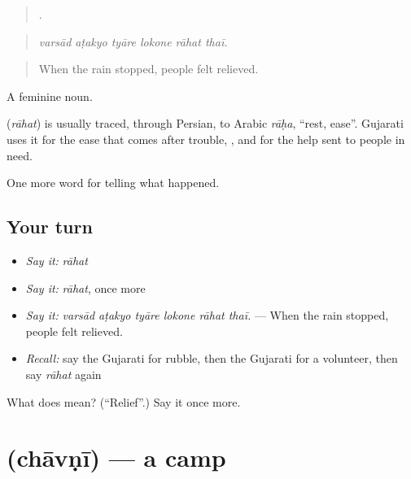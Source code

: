 \begin{quote}
     .
\end{quote}

\begin{quote}
\emph{varsād aṭakyo tyāre lokone rāhat thaī.}
\end{quote}

\begin{quote}
When the rain stopped, people felt relieved.
\end{quote}

A feminine noun.

\begin{cousinweb}
\textbf{} (\emph{rāhat}) is usually traced, through Persian, to Arabic \emph{rāḥa}, \textquotedblleft{}rest, ease\textquotedblright{}. Gujarati uses it for the ease that comes after trouble, \textbf{ }, and for the help sent to people in need.
\end{cousinweb}

\begin{grammarlens}[title={What you've built}]
One more word for telling what happened.
\end{grammarlens}

\subsection*{Your turn}
\begin{itemize}
\raggedright
  \item \emph{Say it:} \emph{rāhat}
  \item \emph{Say it:} \emph{rāhat}, once more
  \item \emph{Say it:} \emph{varsād aṭakyo tyāre lokone rāhat thaī.} — When the rain stopped, people felt relieved.
  \item \emph{Recall:} say the Gujarati for rubble, then the Gujarati for a volunteer, then say \emph{rāhat} again
\end{itemize}

\begin{tcolorbox}[breakable,colback=teal!4,colframe=teal!35!black,title={Before you move on}]
What does  mean? (\textquotedblleft{}Relief\textquotedblright{}.) Say it once more.
\end{tcolorbox}
\section[\texorpdfstring{\gu{છાવણી} (chāvṇī)}{છાવણી (chāvṇī)}]{ (chāvṇī) — a camp}

